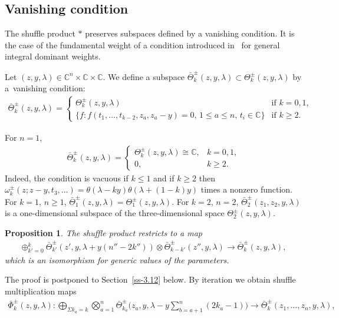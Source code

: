 \documentclass[pdftex]{sigma}
\numberwithin{equation}{section}
\newtheorem{Proposition}[Theorem]{Proposition}
 { \theoremstyle{definition}
\newtheorem{Definition}[Theorem]{Definition}
\newtheorem{Example}[Theorem]{Example}
\newtheorem{Remark}[Theorem]{Remark} }
\begin{document}
\subsection{Vanishing condition}\label{ss-3.3}
The shuffle product $*$ preserves subspaces defined by a vanishing condition. It is the case of the fundamental weight of a condition introduced in~\cite[Section~8]{FelderTarasovVarchenko1997} for general integral dominant weights.

Let $(z,y,\lambda)\in\mathbb C^n\times \mathbb C\times \mathbb C$. We define a subspace $\bar\Theta^\pm_k(z,y,\lambda)\subset\Theta^\pm_k(z,y,\lambda)$ by a~vanishing condition:
\begin{gather*}
 \bar\Theta^\pm_k(z,y,\lambda) = \begin{cases} \Theta^\pm_k(z,y,\lambda)&\text{if $k=0,1$,}\\
\{f \colon f(t_1,\dots,t_{k-2},z_a,z_a-y)=0,\,1\leq a\leq n,\, t_i\in\mathbb C\} &\text{if $k\geq2$.}
\end{cases}
\end{gather*}
\begin{Example}\label{example-5} For $n=1$,
 \begin{gather*}
 \bar\Theta^\pm_k(z,y,\lambda) =\begin{cases}
 \Theta^\pm_k(z,y,\lambda)\cong \mathbb C,&\text{$k=0,1$,}\\
 0,&\text{$k\geq2$.}
 \end{cases}
 \end{gather*}
 Indeed, the condition is vacuous if $k\leq 1$ and if $k\geq2$ then $\omega^\pm_k(z;z-y,t_3,\dots)=\theta(\lambda-ky)\theta(\lambda+(1-k)y)$ times a nonzero function. For $k=1$, $n\geq1$, $\bar\Theta^\pm_1(z,y,\lambda) = \Theta^\pm_1(z,y,\lambda)$. For $k=2$, $n=2$, $\bar\Theta^\pm_2(z_1,z_2,y,\lambda)$ is a one-dimensional subspace of the three-dimensional space $\Theta^\pm_2(z,y,\lambda)$.
\end{Example}
\begin{Proposition}\label{prop-2} The shuffle product restricts to a map
\begin{gather*}
 \oplus_{k'=0}^k \bar\Theta^\pm_{k'} (z',y,\lambda+y(n''-2k'')) \otimes \bar\Theta^\pm_{k-k'} (z'',y,\lambda) \to \bar\Theta^\pm_k(z,y,\lambda),
 \end{gather*}
 which is an isomorphism for generic values of the parameters.
\end{Proposition}
The proof is postponed to Section~\ref{ss-3.12} below. By iteration we obtain shuffle multiplication maps
\begin{gather*}
 \bar\Phi_k^{\pm}(z,y,\lambda)\colon\bigoplus_{\Sigma k_a=k} \bigotimes_{a=1}^n \bar\Theta^\pm_{k_a}\bigg(z_a,y,\lambda-y\sum_{b=a+1}^n(2k_a-1)\bigg) \to \bar\Theta^\pm_k(z_1,\dots,z_n,y,\lambda),
\end{gather*}
\end{document}
